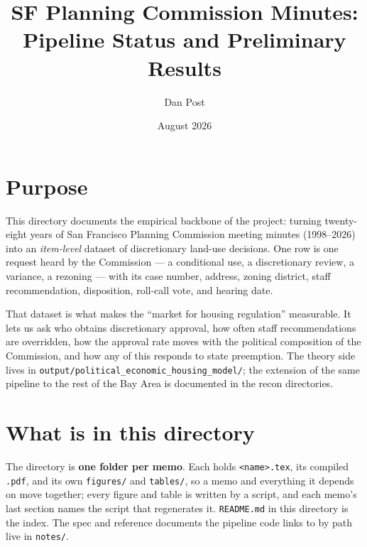 \documentclass[11pt]{article}
\title{SF Planning Commission Minutes:\\ Pipeline Status and Preliminary Results}
\author{Dan Post}
\date{August 2026}
\begin{document}
\maketitle

\section{Purpose}

This directory documents the empirical backbone of the project: turning twenty-eight years
of San Francisco Planning Commission meeting minutes (1998--2026) into an \emph{item-level}
dataset of discretionary land-use decisions. One row is one request heard by the
Commission --- a conditional use, a discretionary review, a variance, a rezoning --- with
its case number, address, zoning district, staff recommendation, disposition, roll-call
vote, and hearing date.

That dataset is what makes the ``market for housing regulation'' measurable. It lets us
ask who obtains discretionary approval, how often staff recommendations are overridden,
how the approval rate moves with the political composition of the Commission, and how any
of this responds to state preemption. The theory side lives in
\texttt{output/political\_economic\_housing\_model/}; the extension of the same pipeline
to the rest of the Bay Area is documented in the recon directories.

\section{What is in this directory}

The directory is \textbf{one folder per memo}. Each holds \texttt{<name>.tex}, its compiled
\texttt{.pdf}, and its own \texttt{figures/} and \texttt{tables/}, so a memo and everything it
depends on move together; every figure and table is written by a script, and each memo's last
section names the script that regenerates it. \texttt{README.md} in this directory is the
index. The spec and reference documents the pipeline code links to by path live in
\texttt{notes/}.
\end{document}
